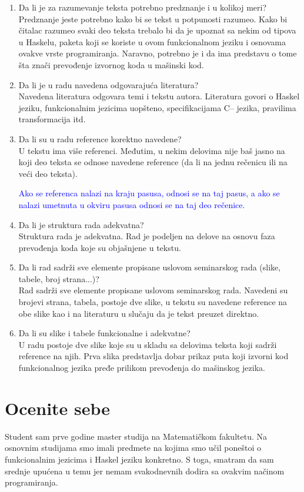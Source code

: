 \documentclass[a4paper]{report}
\newcommand{\odgovor}[1]{\textcolor{blue}{#1}}
\begin{document}
\begin{enumerate}
		\item Da li je za razumevanje teksta potrebno predznanje i u kolikoj meri?\\
		Predznanje jeste potrebno kako bi se tekst u potpunosti razumeo. Kako bi čitalac razumeo svaki deo teksta trebalo bi da je upoznat sa nekim od tipova u Haskelu, paketa koji se koriste u ovom funkcionalnom jeziku i osnovama ovakve vrste programiranja. Naravno, potrebno je i da ima predstavu o tome šta znači prevođenje izvornog koda u mašinski kod.
		\item Da li je u radu navedena odgovarajuća literatura?\\
		Navedena literatura odgovara temi i tekstu autora. Literatura govori o Haskel jeziku, funkcionalnim jezicima uopšteno, specifikacijama C-- jezika, pravilima transformacija itd. 
		\item Da li su u radu reference korektno navedene?\\
		U tekstu ima više referenci. Međutim, u nekim delovima nije baš jasno na koji deo teksta se odnose navedene reference (da li na jednu rečenicu ili na veći deo teksta).
		
		\odgovor{Ako se referenca nalazi na kraju pasusa, odnosi se na taj pasus, a ako se nalazi umetnuta u okviru pasusa odnosi se na taj deo rečenice.}
		
		\item Da li je struktura rada adekvatna?\\
		Struktura rada je adekvatna. Rad je podeljen na delove na osnovu faza prevođenja koda koje su objašnjene u tekstu.
		\item Da li rad sadrži sve elemente propisane uslovom seminarskog rada (slike, tabele, broj strana...)?\\
		Rad sadrži sve elemente propisane uslovom seminarskog rada. Navedeni su brojevi strana, tabela, postoje dve slike, u tekstu su navedene reference na obe slike kao i na literaturu u slučaju da je tekst preuzet direktno.
		\item Da li su slike i tabele funkcionalne i adekvatne?\\
		U radu postoje dve slike koje su u skladu sa delovima teksta koji sadrži reference na njih. Prva slika predstavlja dobar prikaz puta koji izvorni kod funkcionalnog jezika pređe prilikom prevođenja do mašinskog jezika.
	\end{enumerate}
	
	\section{Ocenite sebe}
	Student sam prve godine master studija na Matematičkom fakultetu. Na osnovnim studijama smo imali predmete na kojima smo učil poneštoi o funkcionalnim jezicima i Haskel jeziku konkretno. S toga, smatram da sam srednje upućena u temu jer nemam svakodnevnih dodira sa ovakvim načinom programiranja.
	
\end{document}
